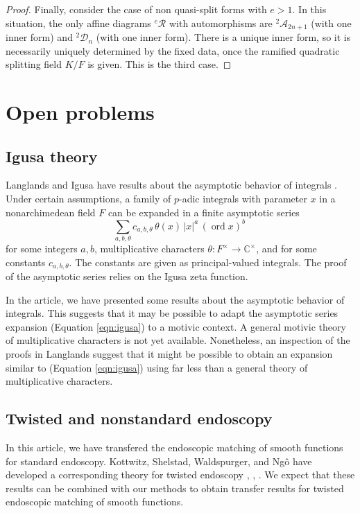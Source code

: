 \documentclass[12pt]{amsart}
\newcommand{\op}[1]{\operatorname{#1}}
\newcommand{\ring}[1]{{\mathbb #1}}
\newcommand{\cal}[1]{\mathcal{#1}}
\def\R{\cal{R}}
\theoremstyle{plain}
\theoremstyle{definition}
\begin{document}
\begin{proof}
Finally, consider the case of non quasi-split forms with $e>1$.  In
this situation, the only affine diagrams ${}^e\R$ with automorphisms
are ${}^2\cal{A}_{2n+1}$ (with one inner form) and ${}^2\cal{D}_n$
(with one inner form).  There is a unique inner form, so it is
necessarily uniquely determined by the fixed data, once the ramified
quadratic splitting field $K/F$ is given. This is the third case.
\end{proof}

\section{Open problems}\label{sec:open-problems}

\subsection{Igusa theory}

Langlands and Igusa have results about the asymptotic behavior of
integrals \cite{langlands1983orbital} \cite{igusa1978lectures}.  Under
certain assumptions, a family of $p$-adic integrals with parameter $x$
in a nonarchimedean field $F$ can be expanded in a finite asymptotic
series
\begin{equation}\label{eqn:igusa}
\sum_{a,b,\theta} c_{a,b,\theta} \,
\theta(x) \,|x|^a \, (\op{ord}x)^b\, 
\end{equation}
for some integers $a,b$, multiplicative characters $\theta:F^\times\to
\ring{C}^\times$, and for some constants $c_{a,b,\theta}$.  The
constants are given as principal-valued integrals.  The proof of the
asymptotic series relies on the Igusa zeta function.

In the article, we have presented some results about the asymptotic
behavior of integrals.  This suggests that it may be possible to adapt
the asymptotic series expansion (Equation \ref{eqn:igusa}) to a motivic
context.  A general motivic theory of multiplicative characters is
not yet available.  Nonetheless, an inspection of the proofs in
Langlands suggest that it might be possible to obtain an
expansion similar to (Equation \ref{eqn:igusa}) using far less than a general
theory of multiplicative characters.

\subsection{Twisted and nonstandard endoscopy}

In this article, we have transfered the endoscopic matching of smooth
functions for standard endoscopy.  Kottwitz, Shelstad, Waldspurger,
and Ng\^o have developed a corresponding theory for twisted endoscopy
\cite{kottwitz1999foundations}, \cite{waldspurger2008endoscopie},
\cite{ngo2010lemme}.  We expect that these results can be combined
with our methods to obtain transfer results for twisted endoscopic
matching of smooth functions.
\end{document}
